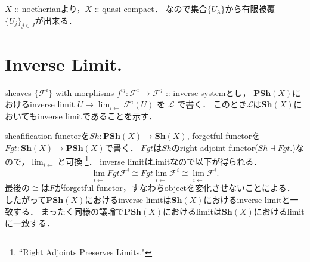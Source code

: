 \documentclass[a4paper]{jsarticle}
\newcommand{\shF}{\mathcal{F}}
\newcommand{\shL}{\mathcal{L}}
\newcommand{\Sh}{\mathbf{Sh}}
\newcommand{\PSh}{\mathbf{PSh}}
\newcommand{\ftorSh}{\mathit{Sh}}
\newcommand{\ftorFgt}{\mathit{Fgt}}
\newcommand{\res}{\operatorname{res}}
\begin{document}
    $X$ :: noetherianより，$X$ :: quasi-compact．
    なので集合$\{U_{\lambda}\}$から有限被覆$\{ U_j \}_{j \in J}$が出来る．


\section{Inverse Limit.} %
    sheaves $\{\shF^i\}$ with morphisms $f^{ij}: \shF^i \to \shF^j$ :: inverse systemとし，
    $\PSh(X)$におけるinverse limit $U \mapsto \lim_{i \leftarrow} \shF^i(U)$ を $\shL$ で書く．
    このとき$\shL$は$\Sh(X)$においてもinverse limitであることを示す．
    
    sheafification functorを$\ftorSh: \PSh(X) \to \Sh(X)$, 
    forgetful functorを$\ftorFgt: \Sh(X) \to \PSh(X)$で書く．
    $\ftorFgt$は$\ftorSh$のright adjoint functor($\ftorSh \dashv \ftorFgt$.)なので，$\lim_{i \leftarrow}$と可換
    \footnote{``Right Adjoints Preserves Limits."}．
    inverse limitはlimitなので以下が得られる．
    \[ \lim_{i \leftarrow} \ftorFgt \shF^i \cong \ftorFgt \lim_{i \leftarrow} \shF^i \cong \lim_{i \leftarrow} \shF^i. \]
    最後の$\cong$は$F$がforgetful functor，すなわちobjectを変化させないことによる．
    したがって$\PSh(X)$におけるinverse limitは$\Sh(X)$におけるinverse limitと一致する．
    まったく同様の議論で$\PSh(X)$におけるlimitは$\Sh(X)$におけるlimitに一致する．
\end{document}
